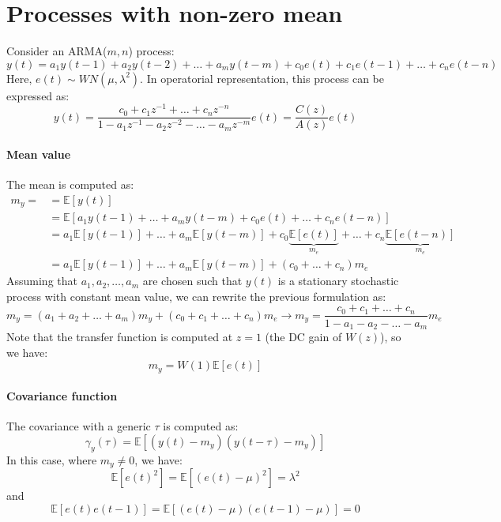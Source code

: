 \section{Processes with non-zero mean}

Consider an ARMA($m,n$) process:
\[y(t)=a_1y(t-1)+a_2y(t-2)+\dots+a_m y(t-m)+c_0e(t)+c_1e(t-1)+\dots+c_n e(t-n) \]
Here, $e(t)\sim WN(\mu,\lambda^2)$.
In operatorial representation, this process can be expressed as:
\[y(t)=\dfrac{c_0+c_1z^{-1}+\dots+c_n z^{-n}}{1- a_1z^{-1}-a_2z^{-2}-\dots-a_m z^{-m}}e(t)=\dfrac{C(z)}{A(z)}e(t)\]

\paragraph*{Mean value}
The mean is computed as:
\begin{align*}
    m_y=    &= \mathbb{E}\left[y(t)\right]  \\
            &= \mathbb{E}\left[a_1y(t-1)+\dots+a_m y(t-m)+c_0e(t)+\dots+c_n e(t-n)\right] \\
            &= a_1\mathbb{E}\left[y(t-1)\right]+\dots+a_m\mathbb{E}\left[y(t-m)\right]+c_0\underbrace{\mathbb{E}\left[e(t)\right]}_{m_e} +\dots+c_n\underbrace{\mathbb{E}\left[e(t-n)\right]}_{m_e} \\
            &= a_1\mathbb{E}\left[y(t-1)\right]+\dots+a_m\mathbb{E}\left[y(t-m)\right]+\left(c_0 +\dots+c_n\right)m_e 
\end{align*}
Assuming that $a_1,a_2,\dots,a_m$ are chosen such that $y(t)$ is a stationary stochastic process with constant mean value, we can rewrite the previous formulation as:
\[m_y=\left(a_1+a_2+\dots+a_m\right)m_y+\left(c_0 +c_1 +\dots+c_n\right)m_e \rightarrow m_y =\dfrac{c_0 +c_1 +\dots+c_n}{1-a_1-a_2-\dots-a_m}m_e\]
Note that the transfer function is computed at $z=1$ (the DC gain of $W(z)$), so we have:
\[m_y=W(1)\mathbb{E}\left[e(t)\right]\]

\paragraph*{Covariance function}
The covariance with a generic $\tau$ is computed as:
\[\gamma_y(\tau)  = \mathbb{E}\left[\left(y(t)-m_y\right)\left(y(t-\tau)-m_y\right)\right]\]
In this case, where $m_y \neq 0$, we have:
\[\mathbb{E}\left[{e(t)}^2\right]=\mathbb{E}\left[{\left(e(t)-\mu\right)}^2\right]= \lambda^2\]
and 
\[\mathbb{E}\left[e(t)e(t-1)\right]=\mathbb{E}\left[\left(e(t)-\mu\right)\left(e(t-1)-\mu\right)\right]= 0\]

